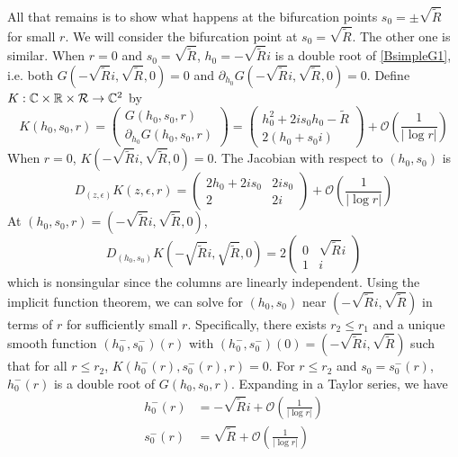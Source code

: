 \documentclass[thesis.tex]{subfiles}
\begin{document}
All that remains is to show what happens at the bifurcation points $s_0 = \pm \sqrt{\tilde{R}}$ for small $r$. We will consider the bifurcation point at $s_0 = \sqrt{\tilde{R}}$. The other one is similar. When $r = 0$ and $s_0 = \sqrt{\tilde{R}}$, $h_0 = -\sqrt{\tilde{R}}i$ is a double root of \cref{BsimpleG1}, i.e. both $G(-\sqrt{\tilde{R}}i, \sqrt{\tilde{R}}, 0) = 0$ and $\partial_{h_0} G(-\sqrt{\tilde{R}}i, \sqrt{\tilde{R}}, 0) = 0$. Define $K: \mathbb{C} \times \mathbb{R} \times \mathcal{R} \rightarrow \mathbb{C}^2$ by
\begin{equation}
K(h_0, s_0, r) = 
\begin{pmatrix}G(h_0, s_0, r) \\ \partial_{h_0}G(h_0, s_0, r) \end{pmatrix} 
= \begin{pmatrix}
h_0^2 + 2 i s_0 h_0 - \tilde{R} \\
2(h_0 + s_0 i) 
\end{pmatrix}
+ \mathcal{O}\left( \frac{1}{|\log r|} \right)
\end{equation}
When $r = 0$, $K\left(-\sqrt{\tilde{R}}i, \sqrt{\tilde{R}}, 0\right) = 0$. The Jacobian with respect to $(h_0, s_0)$ is
\[
D_{(z, \epsilon)}K(z, \epsilon, r) = 
\begin{pmatrix}
2 h_0 + 2 i s_0 & 2 i s_0  \\
2 & 2 i
\end{pmatrix}
+ \mathcal{O}\left( \frac{1}{|\log r|} \right)
\]
At $(h_0, s_0, r) = \left( -\sqrt{\tilde{R}}i, \sqrt{\tilde{R}},0\right)$, 
\[
D_{(h_0, s_0)}K\left( -\sqrt{\tilde{R}}i, \sqrt{\tilde{R}},0\right) = 
2 \begin{pmatrix}
0 & \sqrt{\tilde{R}}i \\
1 & i
\end{pmatrix}
\]
which is nonsingular since the columns are linearly independent. Using the implicit function theorem, we can solve for $(h_0, s_0)$ near $(-\sqrt{\tilde{R}}i, \sqrt{\tilde{R}})$ in terms of $r$ for sufficiently small $r$. Specifically, there exists $r_2 \leq r_1$ and a unique smooth function $(h_0^-, s_0^-)(r)$ with $(h_0^-, s_0^-)(0) = (-\sqrt{\tilde{R}}i, \sqrt{\tilde{R}})$ such that for all $r \leq r_2$, $K(h_0^-(r), s_0^-(r), r) = 0$. For $r \leq r_2$ and $s_0 = s_0^-(r)$, $h_0^-(r)$ is a double root of $G(h_0, s_0, r)$. Expanding in a Taylor series, we have
\begin{align*}
h_0^-(r) &= -\sqrt{\tilde{R}}i + \mathcal{O}\left( \frac{1}{|\log r|} \right) \\
s_0^-(r) &= \sqrt{\tilde{R}} + \mathcal{O}\left( \frac{1}{|\log r|} \right) \\
\end{align*}
\end{document}
